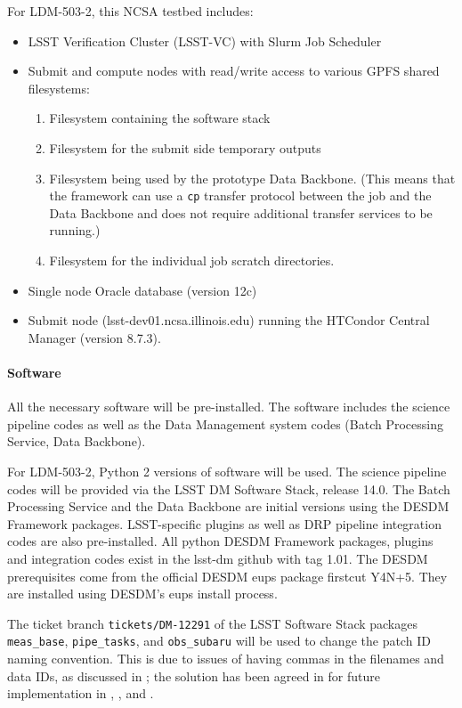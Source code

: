 For LDM-503-2, this NCSA testbed includes:
\begin{itemize}
\item{LSST Verification Cluster (LSST-VC) with Slurm Job Scheduler}
\item{Submit and compute nodes with read/write access to various GPFS shared filesystems:}
\begin{enumerate}
\item{Filesystem containing the software stack}
\item{Filesystem for the submit side temporary outputs}
\item{Filesystem being used by the prototype Data Backbone. (This means that the framework can use a \texttt{cp} transfer protocol between the job and the Data Backbone and does not require additional transfer services to be running.)}
\item{Filesystem for the individual job scratch directories.}
\end{enumerate}
\item{Single node Oracle database (version 12c)} 
\item{Submit node (lsst-dev01.ncsa.illinois.edu) running the HTCondor Central Manager (version 8.7.3).}
\end{itemize}

\paragraph{Software}\label{sec:software}
All the necessary software will be pre-installed.   The software
includes the science pipeline codes as well as the Data Management
system codes (Batch Processing Service, Data Backbone).

For LDM-503-2, Python 2 versions of software will be used.  The
science pipeline codes will be provided via the LSST DM Software
Stack, release 14.0.  The Batch Processing Service and the Data Backbone 
are initial versions using the DESDM Framework packages.  LSST-specific
plugins as well as DRP pipeline integration codes are also pre-installed. 
All python DESDM Framework packages, plugins and integration codes exist
in the lsst-dm github with tag 1.01. The DESDM prerequisites come from 
the official DESDM eups package firstcut Y4N+5.   They are installed
using DESDM's eups install process.

The ticket branch \texttt{tickets/DM-12291} of the LSST Software Stack
packages \texttt{meas{\_}base}, \texttt{pipe{\_}tasks}, and
\texttt{obs{\_}subaru} will be used to change the patch ID naming
convention.  This is due to issues of having commas in the filenames
and data IDs, as discussed in ; the solution has been
agreed in  for future implementation in ,
, and .

